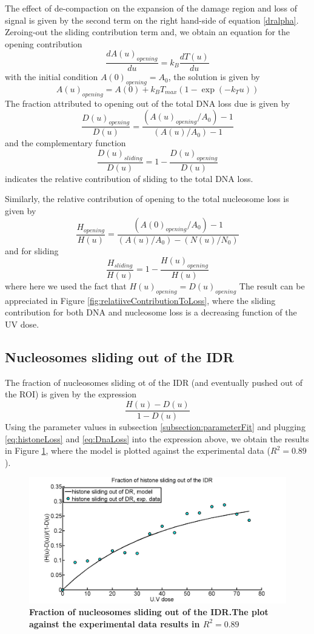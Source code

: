 \documentclass[12pt]{article}
\begin{document}
The effect of de-compaction on the expansion of the damage region and loss of signal is given by the second term on the right hand-side of equation \ref{dralpha}. Zeroing-out the sliding contribution term and,  we obtain an equation for the opening contribution 
\begin{equation*}
\frac{dA(u)_{opening}}{du}=k_B\frac{dT(u)}{du}
\end{equation*}
with the initial condition $A(0)_{opening}=A_0$, the solution is given by
\begin{equation}
A(u)_{opening}= A(0)+k_BT_{max}(1-\exp(-k_Tu))
\end{equation}
The fraction attributed to opening out of the total DNA loss due is given by 
\begin{equation}\label{eq:openingContributionDNA}
\frac{D(u)_{opening}}{D(u)}=\frac{\left(A(u)_{opening}/A_0\right)-1}{\left(A(u)/A_0\right) -1}
\end{equation}
and the complementary function 
\begin{equation}\label{eq:slidingContributionDNA}
\frac{D(u)_{sliding}}{D(u)}=1-\frac{D(u)_{opening}}{D(u)}
\end{equation}
indicates the relative contribution of sliding to the total DNA loss. 

Similarly, the relative contribution of opening to the total nucleosome loss is given by 
\begin{equation}\label{eq:openingContributionHistones}
\frac{H_{opening}}{H(u)} =\frac{\left(A(0)_{opening}/A_0\right)-1}{(A(u)/A_0)-(N(u)/N_0)}
\end{equation}
and for sliding
\begin{equation}\label{eq:slidingContributionHistones}
\frac{H_{sliding}}{H(u)} = 1-\frac{H(u)_{opening}}{H(u)} 
\end{equation}
where here we used the fact that $H(u)_{opening}=D(u)_{opening}$
The result can be appreciated in Figure \ref{fig:relatiiveContributionToLoss}, where the sliding contribution for both DNA and nucleosome loss is a decreasing function of the UV dose. 

\subsection{Nucleosomes sliding out of the IDR}
The fraction of nucleosomes sliding ot of the IDR (and eventually pushed out of the ROI) is given by the expression 
\begin{equation}
\frac{H(u)-D(u)}{1-D(u)}
\end{equation}
Using the parameter values in subsection \ref{subsection:parameterFit} and plugging \ref{eq:histoneLoss} and \ref{eq:DnaLoss} into the expression above, we obtain the results in Figure \ref{fig:fractionSlidingOutOfIDR}, where the model is plotted against the experimental data ($R^2=0.89$). 

\begin{figure}[H]
\centering
\includegraphics[width=0.5\linewidth, height=0.3\textheight]{fractionSlidingOutOfIDR}
\caption{\textbf{Fraction of nucleosomes sliding out of the IDR.The plot against the experimental data results in $R^2=0.89$ }}
\label{fig:fractionSlidingOutOfIDR}
\end{figure}
\end{document}
